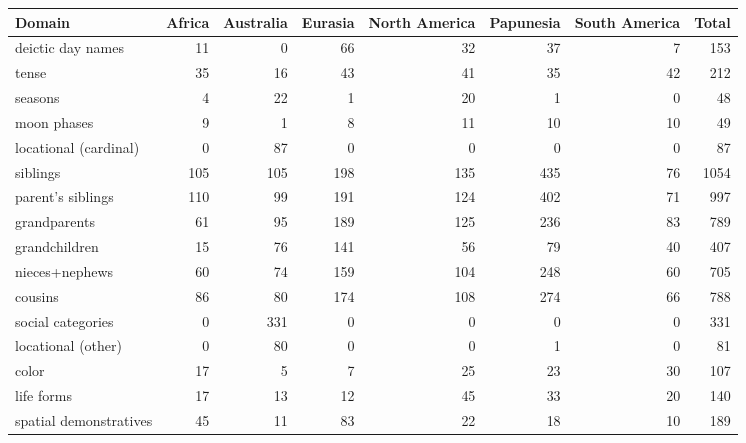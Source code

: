 \begin{table}[ht]
\centering
\begin{tabular}{lrrrrrrr}
  \hline
Domain & Africa & Australia & Eurasia & North America & Papunesia & South America & Total \\ 
  \hline
deictic day names &  11 &   0 &  66 &  32 &  37 &   7 & 153 \\ 
  tense &  35 &  16 &  43 &  41 &  35 &  42 & 212 \\ 
  seasons &   4 &  22 &   1 &  20 &   1 &   0 &  48 \\ 
  moon phases &   9 &   1 &   8 &  11 &  10 &  10 &  49 \\ 
  locational (cardinal) &   0 &  87 &   0 &   0 &   0 &   0 &  87 \\ 
  siblings & 105 & 105 & 198 & 135 & 435 &  76 & 1054 \\ 
  parent's siblings & 110 &  99 & 191 & 124 & 402 &  71 & 997 \\ 
  grandparents &  61 &  95 & 189 & 125 & 236 &  83 & 789 \\ 
  grandchildren &  15 &  76 & 141 &  56 &  79 &  40 & 407 \\ 
  nieces+nephews &  60 &  74 & 159 & 104 & 248 &  60 & 705 \\ 
  cousins &  86 &  80 & 174 & 108 & 274 &  66 & 788 \\ 
  social categories &   0 & 331 &   0 &   0 &   0 &   0 & 331 \\ 
  locational (other) &   0 &  80 &   0 &   0 &   1 &   0 &  81 \\ 
  color &  17 &   5 &   7 &  25 &  23 &  30 & 107 \\ 
  life forms &  17 &  13 &  12 &  45 &  33 &  20 & 140 \\ 
  spatial demonstratives &  45 &  11 &  83 &  22 &  18 &  10 & 189 \\ 
   \hline
\end{tabular}
\end{table}
